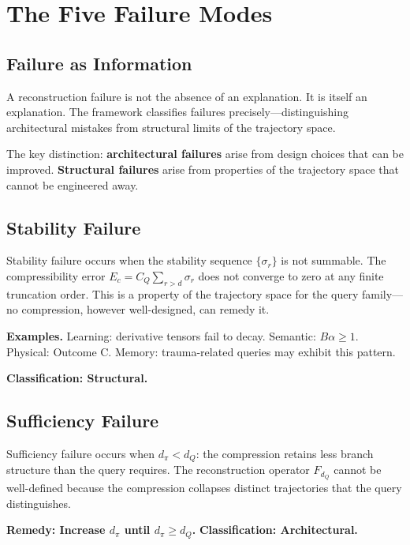 \chapter{The Five Failure Modes}

\section{Failure as Information}

A reconstruction failure is not the absence of an explanation. It is itself an explanation. The framework classifies failures precisely---distinguishing architectural mistakes from structural limits of the trajectory space.

The key distinction: \textbf{architectural failures} arise from design choices that can be improved. \textbf{Structural failures} arise from properties of the trajectory space that cannot be engineered away.

\section{Stability Failure}

Stability failure occurs when the stability sequence $\{\sigma_r\}$ is not summable. The compressibility error $E_c = C_Q \sum_{r>d} \sigma_r$ does not converge to zero at any finite truncation order. This is a property of the trajectory space for the query family---no compression, however well-designed, can remedy it.

\textbf{Examples.} Learning: derivative tensors fail to decay. Semantic: $B\alpha \geq 1$. Physical: Outcome C. Memory: trauma-related queries may exhibit this pattern.

\textbf{Classification: Structural.}

\section{Sufficiency Failure}

Sufficiency failure occurs when $d_\pi < d_Q$: the compression retains less branch structure than the query requires. The reconstruction operator $F_{d_Q}$ cannot be well-defined because the compression collapses distinct trajectories that the query distinguishes.

\textbf{Remedy: Increase $d_\pi$ until $d_\pi \geq d_Q$.} \textbf{Classification: Architectural.}


